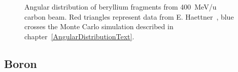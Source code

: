 \begin{figure}[!ht]
{\label{fig:D_43.7_4_N}
}
\label{fig:subfigureExample}
\caption[Optional caption for list of figures]{Angular distribution of beryllium fragments from 400~MeV/u carbon beam. Red triangles represent data from E. Haettner~\cite{ehaettner}, blue crosses the Monte Carlo simulation described in chapter~\ref{AngularDistributionText}.}
\end{figure}
\clearpage
\subsection{Boron}
\begin{figure}[!ht]
\centering
{}
\end{figure}
